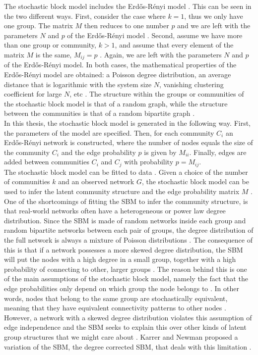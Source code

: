\documentclass[11 pt , letterpaper , twoside , openright]{book}
\begin{document}
The stochastic block model includes the Erd\H{o}s-R\'{e}nyi model \cite{Clauset2017}. This can be seen in the two different ways. First, consider the case where $k = 1$, thus we only have one group. The matrix $M$ then reduces to one number $p$ and we are left with the parameters $N$ and $p$ of the Erd\H{o}s-R\'{e}nyi model \cite{Clauset2017}. Second, assume we have more than one group or community, $k > 1$, and assume that every element of the matrix $M$ is the same, $M_{ij} = p$ \cite{Clauset2017}. Again, we are left with the parameters $N$ and $p$ of the Erd\H{o}s-R\'{e}nyi model. In both cases, the mathematical properties of the Erd\H{o}s-R\'{e}nyi model are obtained: a Poisson degree distribution, an average distance that is logarithmic with the system size $N$, vanishing clustering coefficient for large $N$, etc \cite{Clauset2017}. The structure within the groups or communities of the stochastic block model is that of a random graph, while the structure between the communities is that of a random bipartite graph \cite{Clauset2017}.\\
In this thesis, the stochastic block model is generated in the following way. First, the parameters of the model are specified. Then, for each community $C_i$ an Erd\H{o}s-R\'{e}nyi network is constructed, where the number of nodes equals the size of the community $C_i$ and the edge probability $p$ is given by $M_{ii}$. Finally, edges are added between communities $C_i$ and $C_j$ with probability $p = M_{ij}$.\\
The stochastic block model can be fitted to data \cite{Clauset2017}. Given a choice of the number of communities $k$ and an observed network $G$, the stochastic block model can be used to infer the latent community structure and the edge probability matrix $M$ \cite{Clauset2017}.\\
One of the shortcomings of fitting the SBM to infer the community structure, is that real-world networks often have a heterogeneous or power law degree distribution. Since the SBM is made of random networks inside each group and random bipartite networks between each pair of groups, the degree distribution of the full network is always a mixture of Poisson distributions \cite{Clauset2017}. The consequence of this is that if a network possesses a more skewed degree distribution, the SBM will put the nodes with a high degree in a small group, together with a high probability of connecting to other, larger groups \cite{Clauset2017}. The reason behind this is one of the main assumptions of the stochastic block model, namely the fact that the edge probabilities only depend  on which group the node belongs to \cite{Clauset2017}. In other words, nodes that belong to the same group are stochastically  equivalent, meaning that they have equivalent connectivity patterns to other nodes \cite{Clauset2017}. However, a network with a skewed degree distribution violates this assumption of edge independence and the SBM seeks to explain this over other kinds of latent group structures that we might care about \cite{Clauset2017}. Karrer and Newman proposed a variation of the SBM, the degree corrected SBM, that deals with this limitation \cite{Karrer2011}. 
\end{document}
